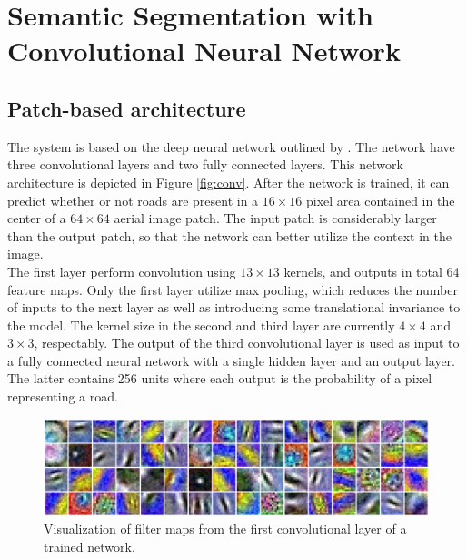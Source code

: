 \section{Semantic Segmentation with Convolutional Neural Network}
\label{sec:network}

\subsection{Patch-based architecture}

The system is based on the deep neural network outlined by \cite{Mnih_aerial_images_noisy}. The network have three convolutional layers and two fully connected layers. This network architecture is depicted in Figure \ref{fig:conv}. After the network is trained, it can predict whether or not roads are present in a $16 \times 16$ pixel area contained in the center of a $64 \times 64$ aerial image patch. The input patch is considerably larger than the output patch, so that the network can better utilize the context in the image. \\

The first layer perform convolution using $13 \times 13$ kernels, and outputs in total 64 feature maps. Only the first layer utilize max pooling, which reduces the number of inputs to the next layer as well as introducing some translational invariance to the model. The kernel size in the second and third layer are currently $4 \times 4$ and $3 \times 3$, respectably. The output of the third convolutional layer is used as input to a fully connected neural network with a single hidden layer and an output layer. The latter contains 256 units where each output is the probability of a pixel representing a road.\\

\begin{figure}
\begin{center}
\includegraphics[width=1\columnwidth]{figs/network/Filter_unblurred.png}
\caption[Visualization of filter map]{Visualization of filter maps from the first convolutional layer of a trained network.}
\label{fig:convoluional_first_layer_visualization}
\end{center}
\end{figure}

